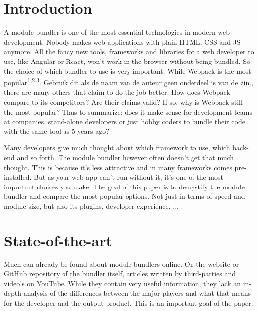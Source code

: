 
\section{Introduction} %
\label{sec:introductie}

A module bundler is one of the most essential technologies in modern web development. Nobody makes web applications with plain HTML, CSS and JS anymore. All the fancy new tools, frameworks and libraries for a web developer to use, like Angular or React, won't work in the browser without being bundled. So the choice of which bundler to use is very important.
While Webpack is the most popular\textsuperscript{1,2,3}. Gebruik dit als de naam van de auteur geen onderdeel is van de zin., there are many others that claim to do the job better. How does Webpack compare to its competitors? Are their claims valid? If so, why is Webpack still the most popular? Thus to summarize: does it make sense for development teams at companies, stand-alone developers or just hobby coders to bundle their code with the same tool as 5 years ago? 

Many developers give much thought about which framework to use, which back-end and so forth. The module bundler however often doesn't get that much thought. This is because it's less attractive and in many frameworks comes pre-installed. But as your web app can't run without it, it's one of the most important choices you make. The goal of this paper is to demystify the module bundler and compare the most popular options. Not just in terms of speed and module size, but also its plugins, developer experience, ... .



\section{State-of-the-art}
\label{sec:state-of-the-art}

Much can already be found about module bundlers online. On the website or GitHub repository of the bundler itself, articles written by third-parties and video's on YouTube. While they contain very useful information, they lack an in-depth analysis of the differences between the major players and what that means for the developer and the output product. This is an important goal of the paper.


